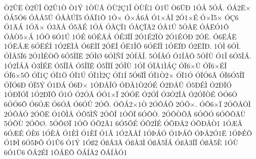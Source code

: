 {^^d22^^db^^cb
^^d22^^db^^ce
^^d22^^db1^^d2
^^d21^^dd
1^^d2^^d9^^c2
^^d2^^d92^^c71^^ce
^^d2^^d9^^c81
^^d21^^dc
^^d26^^dc^^d0
1^^d3^^c1
5^^d3^^c1.
^^d3^^c12^^cb^^d7
^^d3^^c15^^d36
^^d3^^c2^^c55^^da
^^d3^^c2^^c5^^da^^cf5
^^d3^^c2^^cf1^^d4
1^^d3^^d7
^^d3^^d7^^c16^^c5
^^d31^^d7^^c5^^ce
2^^d31^^d7^^c9
^^d3^^d7^^cf5^^d7
^^d3^^c76
^^d31^^c4^^c1
1^^d3^^c4^^d7
^^d33^^c4^^c5
^^d35^^c4^^c9
1^^d3^^c5
^^d3^^c5^^c7^^cf1
^^d3^^c5^^c7^^cf^^c42
^^d3^^c51^^da
5^^d3^^c5^^cb
^^d3^^c5^^cb^^d31^^d4
^^d3^^c5^^d25^^d7^^c1
1^^d3^^d6
6^^d31^^da
1^^d3^^c9
6^^d3^^c9^^c4^^c1
^^d3^^c93^^cf^^cd
2^^d31^^c92^^cf^^d2
2^^d31^^c9^^d3^^d0
2^^d3^^cb.
^^d36^^cb^^c1^^cb
1^^d3^^cb^^c1^^c6
6^^d3^^cb^^c9^^cc
1^^d32^^cb^^cc^^c5
^^d36^^cb^^cc^^cf
2^^d3^^cb^^ce
^^d3^^cb1^^ce^^d5
6^^d3^^cb^^cf^^ce
1^^d3^^cb^^cf^^d0
^^d32^^cb^^cf^^d0.
1^^d3^^cc
6^^d3^^cc.
^^d3^^cc^^c55^^cf6
2^^d31^^cc^^c9^^d2^^d5
6^^d35^^cc^^cf^^cb
2^^d3^^cc^^d8
6^^d3^^cc^^d1^^cd
2^^d3^^cd^^c5^^ce.
5^^d3^^cd^^c5^^d3
^^d31^^cd^^c5^^d4
5^^d3^^cd^^d9
^^d31^^ce
6^^d35^^ce^^c1.
1^^d32^^ce^^c1^^c2
^^d33^^ce^^c9^^cb
^^d35^^ce^^cf^^c5
^^d35^^ce^^cf^^ca
^^d35^^ce^^cf^^cd
2^^d3^^ce^^d9
1^^d3^^cf
^^d3^^cf^^c21^^cc^^c1^^c7
^^d3^^cf6^^d7^^da
^^d3^^cf6^^d7^^c9^^ce
^^d3^^cf6^^d75^^d4
^^d3^^cf1^^c7
^^d3^^cf1^^d6
^^d3^^cf1^^da
^^d3^^cf1^^cc2^^c7
^^d3^^cf1^^cd
5^^d36^^cf^^ce
^^d3^^cf1^^d22^^d7
^^d3^^cf1^^d3
^^d3^^cf^^d36^^c2
^^d3^^cf6^^d35^^ce^^cf
^^d3^^cf^^d36^^d0
^^d3^^cf5^^dd
^^d31^^d0^^c1
^^d36^^d0^^d7
1^^d3^^d0^^c5^^ce^^d3
^^d3^^d0^^c51^^d22^^d3^^c9
^^d32^^d0^^c5^^db
^^d35^^d0^^c9^^cc
^^d32^^d0^^cf^^d3
1^^d3^^d0^^cf^^d3^^cf
1^^d32^^d0^^cf^^d4
^^d31^^d3
^^d32^^d3^^c2
^^d3^^d31^^d7^^cf
2^^d3^^d3^^cb
^^d32^^d3^^ce
^^d33^^d32^^ce^^c5
^^d32^^d3^^cf^^d2^^c9
^^d3^^d36^^d3
6^^d3^^d36^^d4
^^d36^^d3^^c6
^^d36^^d3^^c3
^^d36^^d3^^db
2^^d3^^d4.
^^d3^^d4^^c12^^d71^^d2
2^^d3^^d4^^c1^^d5
2^^d3^^d4^^d7.
^^d3^^d46^^d7^^cf
2^^d3^^d4^^c5^^d2^^cc
2^^d3^^d4^^c5^^d3
2^^d3^^d4^^cb
^^d31^^d4^^cc^^c5
^^d3^^d45^^cc^^d1
2^^d3^^d4^^ce
1^^d3^^d4^^cf
6^^d3^^d4^^d2.
2^^d3^^d4^^d2^^d5^^c2
6^^d3^^d4^^d3
6^^d3^^d4^^d5^^c4^^d9
5^^d3^^d4^^d9
2^^d3^^d4^^d8.
5^^d3^^d4^^d8^^cf
1^^d3^^d5
^^d3^^d52^^c21
6^^d35^^d5^^c9
^^d3^^d52^^ce^^c9
^^d3^^d5^^d0^^c52
^^d3^^d5^^d0^^c5^^d21
1^^d3^^c6^^c5
6^^d3^^c6^^c9
^^d3^^c86
1^^d3^^c8^^c5
^^d31^^c8^^cc
^^d31^^c8^^cf
^^d31^^c3
1^^d32^^c3^^c5^^cd
1^^d3^^de^^c1^^d3
^^d31^^de^^c1^^d4
^^d3^^de^^c52^^d31^^cb
1^^d3^^de^^c9^^d4
^^d31^^de^^cc
6^^d35^^de^^d5
^^d31^^db6
^^d31^^dd
1^^d3^^df2
^^d3^^df^^c53^^c4
^^d3^^df^^c53^^cc
^^d3^^df^^c55^^cd^^c1
^^d3^^df^^c53^^cd^^cf
^^d3^^df^^c55^^c8
1^^d3^^d9
6^^d31^^dc6
^^d4^^c12^^c9^^cc
1^^d4^^c1^^cb^^d4
^^d4^^c1^^cd^^c52
^^d4^^c1^^cd^^c5^^d31
}
